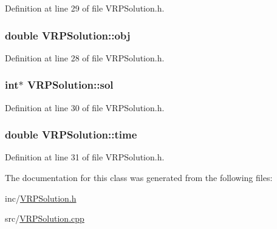 Definition at line 29 of file VRPSolution.h.

\hypertarget{class_v_r_p_solution_a1c007774a32dd2973cba3d2d52fccb90}{
\subsubsection[{obj}]{\setlength{\rightskip}{0pt plus 5cm}double {\bf VRPSolution::obj}}}
\label{class_v_r_p_solution_a1c007774a32dd2973cba3d2d52fccb90}


Definition at line 28 of file VRPSolution.h.

\hypertarget{class_v_r_p_solution_a1ef22fb6b5f13044ee9fc84e3fc5c2c2}{
\subsubsection[{sol}]{\setlength{\rightskip}{0pt plus 5cm}int$\ast$ {\bf VRPSolution::sol}}}
\label{class_v_r_p_solution_a1ef22fb6b5f13044ee9fc84e3fc5c2c2}


Definition at line 30 of file VRPSolution.h.

\hypertarget{class_v_r_p_solution_ac6eba85ad901fbe6b53bd0e046adebf3}{
\subsubsection[{time}]{\setlength{\rightskip}{0pt plus 5cm}double {\bf VRPSolution::time}}}
\label{class_v_r_p_solution_ac6eba85ad901fbe6b53bd0e046adebf3}


Definition at line 31 of file VRPSolution.h.



The documentation for this class was generated from the following files:\begin{DoxyCompactItemize}
\item 
inc/\hyperlink{_v_r_p_solution_8h}{VRPSolution.h}\item 
src/\hyperlink{_v_r_p_solution_8cpp}{VRPSolution.cpp}\end{DoxyCompactItemize}

